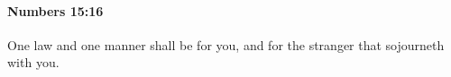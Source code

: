 
		\paragraph{Numbers 15:16} %
			\label{NUMBERS-15-16}

			One law and one manner shall be for you, and for the stranger that sojourneth with you.


